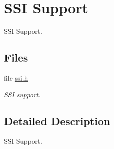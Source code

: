 \hypertarget{group__lm3s69xx__ssi}{}\section{S\+SI Support}
\label{group__lm3s69xx__ssi}


S\+SI Support.  


\subsection*{Files}
\begin{DoxyCompactItemize}
\item 
file \mbox{\hyperlink{ssi_8h}{ssi.\+h}}
\begin{DoxyCompactList}\small\item\em S\+SI support. \end{DoxyCompactList}\end{DoxyCompactItemize}


\subsection{Detailed Description}
S\+SI Support. 

